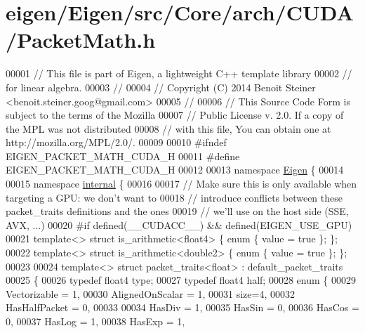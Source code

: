 \hypertarget{eigen_2_eigen_2src_2_core_2arch_2_c_u_d_a_2_packet_math_8h_source}{}\section{eigen/\+Eigen/src/\+Core/arch/\+C\+U\+D\+A/\+Packet\+Math.h}
\label{eigen_2_eigen_2src_2_core_2arch_2_c_u_d_a_2_packet_math_8h_source}

\begin{DoxyCode}
00001 \textcolor{comment}{// This file is part of Eigen, a lightweight C++ template library}
00002 \textcolor{comment}{// for linear algebra.}
00003 \textcolor{comment}{//}
00004 \textcolor{comment}{// Copyright (C) 2014 Benoit Steiner <benoit.steiner.goog@gmail.com>}
00005 \textcolor{comment}{//}
00006 \textcolor{comment}{// This Source Code Form is subject to the terms of the Mozilla}
00007 \textcolor{comment}{// Public License v. 2.0. If a copy of the MPL was not distributed}
00008 \textcolor{comment}{// with this file, You can obtain one at http://mozilla.org/MPL/2.0/.}
00009 
00010 \textcolor{preprocessor}{#ifndef EIGEN\_PACKET\_MATH\_CUDA\_H}
00011 \textcolor{preprocessor}{#define EIGEN\_PACKET\_MATH\_CUDA\_H}
00012 
00013 \textcolor{keyword}{namespace }\hyperlink{namespace_eigen}{Eigen} \{
00014 
00015 \textcolor{keyword}{namespace }\hyperlink{namespaceinternal}{internal} \{
00016 
00017 \textcolor{comment}{// Make sure this is only available when targeting a GPU: we don't want to}
00018 \textcolor{comment}{// introduce conflicts between these packet\_traits definitions and the ones}
00019 \textcolor{comment}{// we'll use on the host side (SSE, AVX, ...)}
00020 \textcolor{preprocessor}{#if defined(\_\_CUDACC\_\_) && defined(EIGEN\_USE\_GPU)}
00021 \textcolor{keyword}{template}<> \textcolor{keyword}{struct }is\_arithmetic<float4>  \{ \textcolor{keyword}{enum} \{ value = \textcolor{keyword}{true} \}; \};
00022 \textcolor{keyword}{template}<> \textcolor{keyword}{struct }is\_arithmetic<double2> \{ \textcolor{keyword}{enum} \{ value = \textcolor{keyword}{true} \}; \};
00023 
00024 \textcolor{keyword}{template}<> \textcolor{keyword}{struct }packet\_traits<float> : default\_packet\_traits
00025 \{
00026   \textcolor{keyword}{typedef} float4 type;
00027   \textcolor{keyword}{typedef} float4 half;
00028   \textcolor{keyword}{enum} \{
00029     Vectorizable = 1,
00030     AlignedOnScalar = 1,
00031     size=4,
00032     HasHalfPacket = 0,
00033 
00034     HasDiv  = 1,
00035     HasSin  = 0,
00036     HasCos  = 0,
00037     HasLog  = 1,
00038     HasExp  = 1,

\end{DoxyCode}
